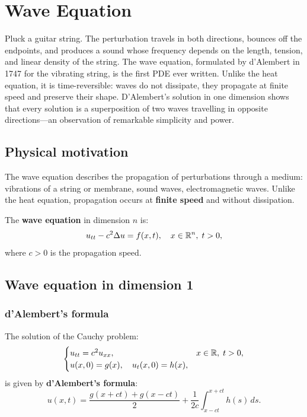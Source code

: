 \chapter{Wave Equation}
\label{ch:wave}

Pluck a guitar string. The perturbation travels in both directions, bounces off the endpoints, and produces a sound whose frequency depends on the length, tension, and linear density of the string. The wave equation, formulated by d'Alembert in 1747 for the vibrating string, is the first PDE ever written. Unlike the heat equation, it is time-reversible: waves do not dissipate, they propagate at finite speed and preserve their shape. D'Alembert's solution in one dimension shows that every solution is a superposition of two waves travelling in opposite directions---an observation of remarkable simplicity and power.

\section{Physical motivation}

The wave equation describes the propagation of perturbations through a
medium: vibrations of a string or membrane, sound waves, electromagnetic
waves. Unlike the heat equation, propagation occurs at \textbf{finite speed}
and without dissipation.

\begin{definition}
The \textbf{wave equation} in dimension $n$ is:
\begin{equation}\label{eq:wave}
    u_{tt} - c^2 \Delta u = f(x,t), \quad x \in \mathbb{R}^n,\; t > 0,
\end{equation}
where $c > 0$ is the propagation speed.
\end{definition}

\section{Wave equation in dimension 1}

\subsection{d'Alembert's formula}

\begin{theorem}
The solution of the Cauchy problem:
\begin{equation}\label{eq:cauchy_wave_1d}
    \begin{cases}
        u_{tt} = c^2 u_{xx}, & x \in \mathbb{R},\; t > 0,\\
        u(x,0) = g(x), \quad u_t(x,0) = h(x),
    \end{cases}
\end{equation}
is given by \textbf{d'Alembert's formula}:
\begin{equation}\label{eq:dalembert}
    \boxed{u(x,t) = \frac{g(x+ct) + g(x-ct)}{2}
    + \frac{1}{2c}\int_{x-ct}^{x+ct} h(s)\, ds.}
\end{equation}
\end{theorem}

